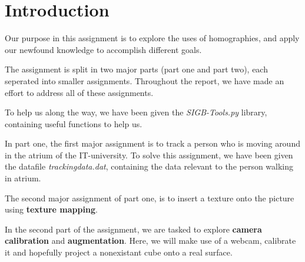 \section{Introduction}
Our purpose in this assignment is to explore the uses of homographies, and apply our newfound knowledge to accomplish different goals.\newline

The assignment is split in two major parts (part one and part two), each seperated into smaller assignments. Throughout the report, we have made an effort to address all of these assignments.\newline

To help us along the way, we have been given the \textsl{SIGB-Tools.py} library, containing useful functions to help us.\newline

In part one, the first major assignment is to track a person who is moving around in the atrium of the IT-university. To solve this assignment, we have been given the datafile \textsl{trackingdata.dat}, containing the data relevant to the person walking in atrium.\newline

The second major assignment of part one, is to insert a texture onto the picture using \textbf{texture mapping}.\newline

In the second part of the assignment, we are tasked to explore \textbf{camera calibration} and \textbf{augmentation}. Here, we will make use of a webcam, calibrate it and hopefully project a nonexistant cube onto a real surface.